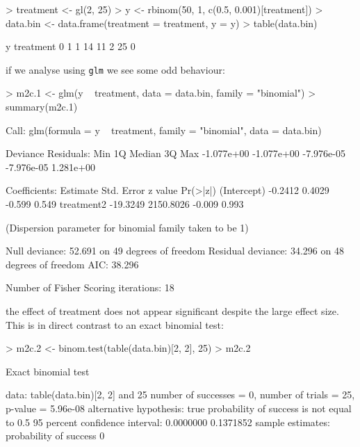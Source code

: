 \documentclass{article}
\begin{document}
\begin{Schunk}
\begin{Sinput}
> treatment <- gl(2, 25)
> y <- rbinom(50, 1, c(0.5, 0.001)[treatment])
> data.bin <- data.frame(treatment = treatment, y = y)
> table(data.bin)
\end{Sinput}
\begin{Soutput}
         y
treatment  0  1
        1 14 11
        2 25  0
\end{Soutput}
\end{Schunk}
 
if we analyse using \texttt{glm} we see some odd behaviour:

\begin{Schunk}
\begin{Sinput}
> m2c.1 <- glm(y ~ treatment, data = data.bin, family = "binomial")
> summary(m2c.1)
\end{Sinput}
\begin{Soutput}
Call:
glm(formula = y ~ treatment, family = "binomial", data = data.bin)

Deviance Residuals: 
       Min          1Q      Median          3Q         Max  
-1.077e+00  -1.077e+00  -7.976e-05  -7.976e-05   1.281e+00  

Coefficients:
             Estimate Std. Error z value Pr(>|z|)
(Intercept)   -0.2412     0.4029  -0.599    0.549
treatment2   -19.3249  2150.8026  -0.009    0.993

(Dispersion parameter for binomial family taken to be 1)

    Null deviance: 52.691  on 49  degrees of freedom
Residual deviance: 34.296  on 48  degrees of freedom
AIC: 38.296

Number of Fisher Scoring iterations: 18
\end{Soutput}
\end{Schunk}

the effect of treatment does not appear significant despite the large effect size. This is in direct contrast to an exact binomial test: 

\begin{Schunk}
\begin{Sinput}
> m2c.2 <- binom.test(table(data.bin)[2, 2], 25)
> m2c.2
\end{Sinput}
\begin{Soutput}
	Exact binomial test

data:  table(data.bin)[2, 2] and 25 
number of successes = 0, number of trials = 25, p-value = 5.96e-08
alternative hypothesis: true probability of success is not equal to 0.5 
95 percent confidence interval:
 0.0000000 0.1371852 
sample estimates:
probability of success 
                     0 
\end{Soutput}
\end{Schunk}
\end{document}
